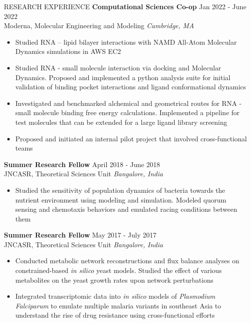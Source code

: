\documentclass{resume} %
\begin{document}
\begin{rSection}{RESEARCH EXPERIENCE}
   \textbf{Computational Sciences Co-op} \hfill Jan 2022 - June 2022\\
   Moderna, Molecular Engineering and Modeling \hfill \textit{Cambridge, MA}
   \begin{itemize}
      \itemsep -3pt {}
      \item Studied RNA – lipid bilayer interactions with NAMD All-Atom Molecular Dynamics simulations in AWS EC2
      \item Studied RNA - small molecule interaction via docking and Molecular Dynamics. Proposed and implemented a python analysis suite for initial validation of binding pocket interactions and ligand conformational dynamics
      \item Investigated and benchmarked alchemical and geometrical routes for RNA - small molecule binding free energy calculations. Implemented a pipeline for test molecules that can be extended for a large ligand library screening
      \item  Proposed and initiated an internal pilot project that involved cross-functional teams
   \end{itemize}

   \textbf{Summer Research Fellow} \hfill April 2018 - June 2018\\
   JNCASR, Theoretical Sciences Unit \hfill \textit{Bangalore, India}
   \begin{itemize}
      \itemsep -3pt {}
      \item Studied the sensitivity of population dynamics of bacteria towards the nutrient environment using modeling and simulation. Modeled quorum sensing and chemotaxis behaviors and emulated racing conditions between them
   \end{itemize}

   \textbf{Summer Research Fellow} \hfill May 2017 - July 2017\\
   JNCASR, Theoretical Sciences Unit \hfill \textit{Bangalore, India}
   \begin{itemize}
      \itemsep -3pt {}
      \item Conducted metabolic network reconstructions and flux balance analyses on constrained-based \textit{in silico} yeast models. Studied the effect of various metabolites on the yeast growth rates upon network perturbations
      \item Integrated transcriptomic data into \textit{in silico} models of \textit{Plasmodium Falciparum} to emulate multiple malaria variants in southeast Asia to understand the rise of drug resistance using cross-functional efforts
   \end{itemize}

\end{rSection}
\end{document}
